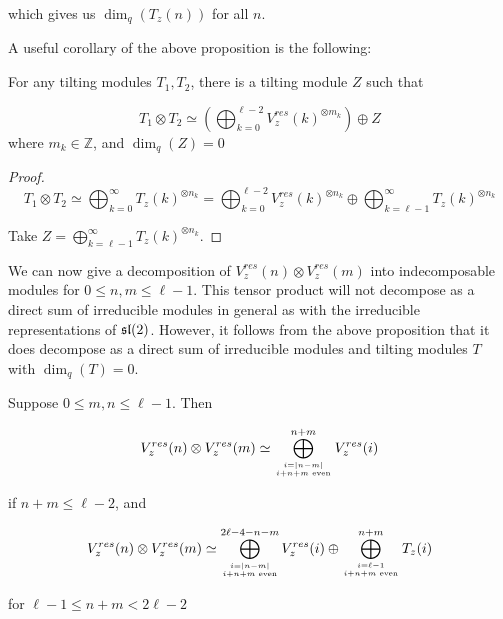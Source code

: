 which gives us $\dim_q(T_z(n))$ for all $n$.

A useful corollary of the above proposition is the following:

\begin{corollary}
\label{theorem:tensortilting}
    For any tilting modules $T_1, T_2$, there is a tilting module $Z$ such that 

    \begin{equation}
            T_1 \otimes T_2 \simeq \left(\bigoplus_{k=0}^{\ell - 2} V_z^{res}(k)^{\otimes m_k}\right) \oplus Z
    \end{equation}
    where $m_k \in \mathbb{Z}$, and $\dim_q(Z) = 0$
\end{corollary}
\begin{proof}
\begin{equation}
    T_1 \otimes T_2 \simeq \bigoplus_{k=0}^{\infty} T_z(k)^{\otimes n_k} =
    \bigoplus_{k=0}^{\ell-2} V_z^{res}(k)^{\otimes n_k} \oplus
    \bigoplus_{k=\ell-1}^{\infty} T_z(k)^{\otimes n_k}
\end{equation}

Take $Z = \displaystyle\bigoplus_{k=\ell-1}^{\infty} T_z(k)^{\otimes n_k}$.
\end{proof}

We can now give a decomposition of $V_z^{res}(n) \otimes V_z^{res}(m)$ into
indecomposable modules for $0 \leq n,m \leq \ell-1$.  This tensor product will
not decompose as a direct sum of irreducible modules in general as with the
irreducible representations of $\mathfrak{sl}(2)$. However, it follows from the above
proposition that it does decompose as a direct sum of irreducible modules and
tilting modules $T$ with $\dim_q(T) = 0$.

\begin{prop}
\label{theorem:decomposition}
Suppose $0 \leq m,n \leq \ell - 1$. Then

\begin{equation}
V_z^{res}(n) \otimes V_{z}^{res}(m) \simeq \bigoplus_{i=|n-m| \atop i + n + m \text{ even}}^{n+m} V_z^{res}(i) 
\end{equation}

if $n+m \leq \ell - 2$, and 

\begin{equation}
V_z^{res}(n) \otimes V_{z}^{res}(m) \simeq \bigoplus_{i=|n-m| \atop i + n + m \text{ even}}^{2\ell - 4 - n - m} V_z^{res}(i) 
                                    \oplus \bigoplus_{i = \ell - 1 \atop i + n + m \text{ even}} ^{n + m} T_z(i)
\end{equation}

for $\ell - 1 \leq n + m < 2\ell - 2$
\end{prop}


